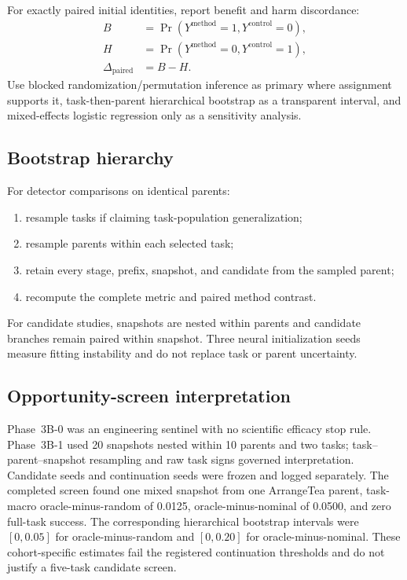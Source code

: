 For exactly paired initial identities, report benefit and harm discordance:
\begin{align}
  B &= \Pr(Y^{\mathrm{method}}=1,Y^{\mathrm{control}}=0),\\
  H &= \Pr(Y^{\mathrm{method}}=0,Y^{\mathrm{control}}=1),\\
  \Delta_{\mathrm{paired}} &= B-H.
\end{align}
Use blocked randomization/permutation inference as primary where assignment supports it, task-then-parent hierarchical bootstrap as a transparent interval, and mixed-effects logistic regression only as a sensitivity analysis.

\subsection{Bootstrap hierarchy}

For detector comparisons on identical parents:
\begin{enumerate}
  \item resample tasks if claiming task-population generalization;
  \item resample parents within each selected task;
  \item retain every stage, prefix, snapshot, and candidate from the sampled parent;
  \item recompute the complete metric and paired method contrast.
\end{enumerate}
For candidate studies, snapshots are nested within parents and candidate branches remain paired within snapshot. Three neural initialization seeds measure fitting instability and do not replace task or parent uncertainty.

\subsection{Opportunity-screen interpretation}

Phase~3B-0 was an engineering sentinel with no scientific efficacy stop rule. Phase~3B-1 used 20 snapshots nested within 10 parents and two tasks; task--parent--snapshot resampling and raw task signs governed interpretation. Candidate seeds and continuation seeds were frozen and logged separately. The completed screen found one mixed snapshot from one ArrangeTea parent, task-macro oracle-minus-random of 0.0125, oracle-minus-nominal of 0.0500, and zero full-task success. The corresponding hierarchical bootstrap intervals were $[0,0.05]$ for oracle-minus-random and $[0,0.20]$ for oracle-minus-nominal. These cohort-specific estimates fail the registered continuation thresholds and do not justify a five-task candidate screen.

